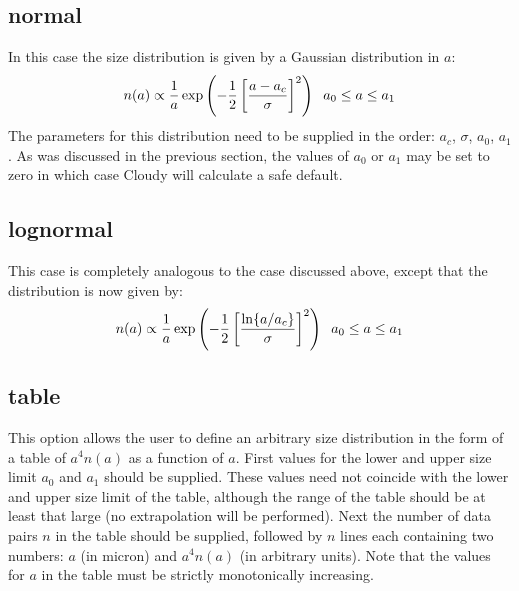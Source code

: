 \subsection{normal}
In this case the size distribution is given by a Gaussian distribution in $a$:
\[ n(a) \propto \frac{1}{a} \exp \left( -\frac{1}{2} \left[ \frac{a -
      a_c}{\sigma} \right]^2 \right) \hspace{2mm} a_0 \leq a \leq a_1 \] The
parameters for this distribution need to be supplied in the order: $a_c$,
$\sigma$, $a_0$, $a_1$. As was discussed in the previous section, the values
of $a_0$ or $a_1$ may be set to zero in which case Cloudy will calculate a
safe default.
\subsection{lognormal}
This case is completely analogous to the  case discussed
above, except that the distribution is now given by:
\[ n(a) \propto \frac{1}{a} \exp \left( -\frac{1}{2} \left[
    \frac{\ln\{a/a_c\}}{\sigma} \right]^2 \right) \hspace{2mm} a_0 \leq a \leq
a_1 \]
\subsection{table}
\label{sdtable}
This option allows the user to define an arbitrary size distribution in the
form of a table of $a^4 n(a)$ as a function of $a$. First values for the lower
and upper size limit $a_0$ and $a_1$ should be supplied. These values need not
coincide with the lower and upper size limit of the table, although the range
of the table should be at least that large (no extrapolation will be
performed). Next the number of data pairs $n$ in the table should be supplied,
followed by $n$ lines each containing two numbers: $a$ (in micron) and $a^4
n(a)$ (in arbitrary units). Note that the values for $a$ in the table must be
strictly monotonically increasing.

